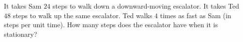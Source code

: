 It takes Sam $24$ steps to walk down a downward-moving escalator. It takes Ted $48$ steps to walk up the same escalator. Ted walks $4$ times as fast as Sam (in steps per unit time). How many steps does the escalator have when it is stationary?
